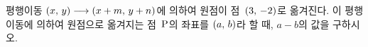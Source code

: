 평행이동 $(x,\mkern3mu y)\longrightarrow(x+m,\mkern3mu y+n)$에 의하여 원점이 점~$(3,\mkern3mu -2)$로 옮겨진다. 이 평행이동에 의하여 원점으로 옮겨지는 점~$\mathrm{P}$의 좌표를 $(a,\mkern3mu b)$라 할 때, $a-b$의 값을 구하시오.
